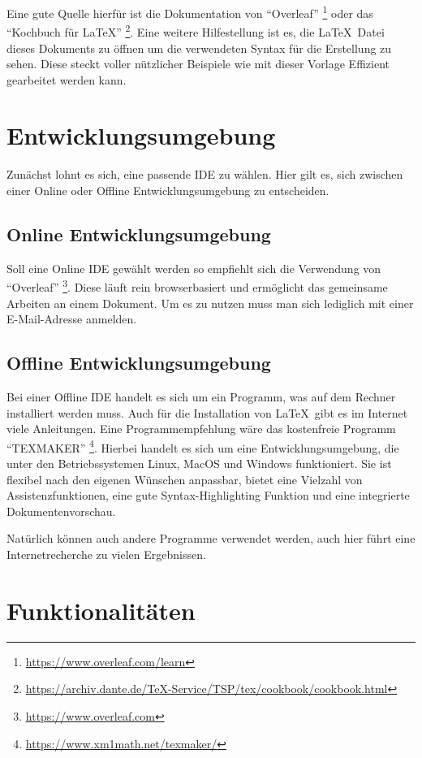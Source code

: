 Eine gute Quelle hierfür ist die Dokumentation von \enquote{Overleaf} \footnote{\url{https://www.overleaf.com/learn}} oder das \enquote{Kochbuch für \LaTeX} \footnote{\url{https://archiv.dante.de/TeX-Service/TSP/tex/cookbook/cookbook.html}}. Eine weitere Hilfestellung ist es, die \LaTeX\ Datei dieses Dokuments zu öffnen um die verwendeten Syntax für die Erstellung zu sehen. Diese steckt voller nützlicher Beispiele wie mit dieser Vorlage Effizient gearbeitet werden kann.

\section{Entwicklungsumgebung}

Zunächst lohnt es sich, eine passende \ac{IDE} zu wählen. Hier gilt es, sich zwischen einer Online oder Offline Entwicklungsumgebung zu entscheiden.

\subsection{Online Entwicklungsumgebung}

Soll eine Online \ac{IDE} gewählt werden so empfiehlt sich die Verwendung von \enquote{Overleaf} \footnote{\url{https://www.overleaf.com}}. Diese läuft rein browserbasiert und ermöglicht das gemeinsame Arbeiten an einem Dokument. Um es zu nutzen muss man sich lediglich mit einer E-Mail-Adresse anmelden.

\subsection{Offline Entwicklungsumgebung}

Bei einer Offline \ac{IDE} handelt es sich um ein Programm, was auf dem Rechner installiert werden muss. Auch für die Installation von \LaTeX\ gibt es im Internet viele Anleitungen. Eine Programmempfehlung wäre das kostenfreie Programm \enquote{TEXMAKER} \footnote{\url{https://www.xm1math.net/texmaker/}}. Hierbei handelt es sich um eine Entwicklungsumgebung, die unter den Betriebssystemen Linux, MacOS und Windows funktioniert. Sie ist flexibel nach den eigenen Wünschen anpassbar, bietet eine Vielzahl von Assistenzfunktionen, eine gute Syntax-Highlighting Funktion und eine integrierte Dokumentenvorschau.

Natürlich können auch andere Programme verwendet werden, auch hier führt eine Internetrecherche zu vielen Ergebnissen.

\section{Funktionalitäten}

